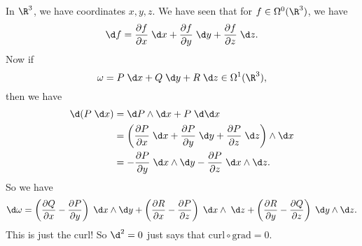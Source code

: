 \documentclass[a4paper]{article}
\begin{document}
\begin{eg}
  In $\R^3$, we have coordinates $x, y, z$. We have seen that for $f \in \Omega^0(\R^3)$, we have
  \[
    \d f = \frac{\partial f}{\partial x}\;\d x + \frac{\partial f}{\partial y}\;\d y + \frac{\partial f}{\partial z}\;\d z.
  \]
  Now if
  \[
    \omega = P\;\d x + Q\;\d y+ R \;\d z \in \Omega^1(\R^3),
  \]
  then we have
  \begin{align*}
    \d(P \;\d x) &= \d P \wedge \d x + P\; \d \d x\\
    &= \left(\frac{\partial P}{\partial x}\;\d x + \frac{\partial P}{\partial y} \;\d y + \frac{\partial P}{\partial z} \;\d z\right)\wedge \d x\\
    &= -\frac{\partial P}{\partial y} \;\d x \wedge \d y - \frac{\partial P}{\partial z}\;\d x \wedge \d z.
  \end{align*}
  So we have
  \[
    \d \omega = \left(\frac{\partial Q}{\partial x} - \frac{\partial P}{\partial y}\right)\;\d x \wedge \d y + \left(\frac{\partial R}{\partial x} - \frac{\partial P}{\partial z}\right)\;\d x \wedge \;\d z + \left(\frac{\partial R}{\partial y} - \frac{\partial Q}{\partial z}\right)\;\d y \wedge \d z.
  \]
  This is just the curl! So $\d^2 = 0$ just says that $\mathrm{curl} \circ \mathrm{grad} = 0$.
\end{eg}
\end{document}
